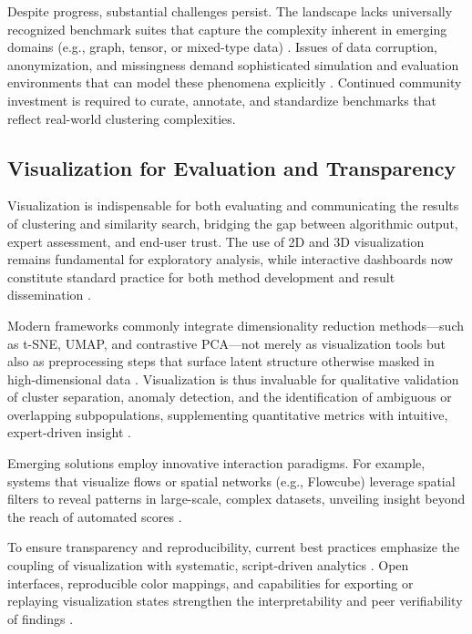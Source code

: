 \documentclass[sigconf]{acmart}
\begin{document}
Despite progress, substantial challenges persist. The landscape lacks universally recognized benchmark suites that capture the complexity inherent in emerging domains (e.g., graph, tensor, or mixed-type data) \cite{ref27, ref28, ref36, ref46, ref110}. Issues of data corruption, anonymization, and missingness demand sophisticated simulation and evaluation environments that can model these phenomena explicitly \cite{ref94, ref95, ref96, ref99}. Continued community investment is required to curate, annotate, and standardize benchmarks that reflect real-world clustering complexities.

\subsection{Visualization for Evaluation and Transparency}

Visualization is indispensable for both evaluating and communicating the results of clustering and similarity search, bridging the gap between algorithmic output, expert assessment, and end-user trust. The use of 2D and 3D visualization remains fundamental for exploratory analysis, while interactive dashboards now constitute standard practice for both method development and result dissemination \cite{ref53,ref58,ref79,ref86,ref91,ref92,ref94,ref95,ref99,ref115}.

Modern frameworks commonly integrate dimensionality reduction methods---such as t-SNE, UMAP, and contrastive PCA---not merely as visualization tools but also as preprocessing steps that surface latent structure otherwise masked in high-dimensional data \cite{ref91,ref92,ref95}. Visualization is thus invaluable for qualitative validation of cluster separation, anomaly detection, and the identification of ambiguous or overlapping subpopulations, supplementing quantitative metrics with intuitive, expert-driven insight \cite{ref58,ref92,ref94,ref95}.

Emerging solutions employ innovative interaction paradigms. For example, systems that visualize flows or spatial networks (e.g., Flowcube) leverage spatial filters to reveal patterns in large-scale, complex datasets, unveiling insight beyond the reach of automated scores \cite{ref53}.

To ensure transparency and reproducibility, current best practices emphasize the coupling of visualization with systematic, script-driven analytics \cite{ref94,ref99,ref115}. Open interfaces, reproducible color mappings, and capabilities for exporting or replaying visualization states strengthen the interpretability and peer verifiability of findings \cite{ref86,ref115}.
\end{document}
